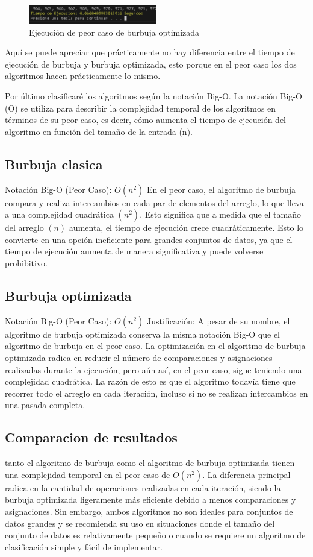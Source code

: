 \documentclass[journal]{IEEEtran}
\begin{document}
  \begin{figure}[H]
    \centering
    \begin{adjustbox}{clip=false}
      \includegraphics[width=0.5\textwidth]{23.PNG}
    \end{adjustbox}
    \caption{Ejecución de peor caso de burbuja optimizada}
  \end{figure}
  Aquí se puede apreciar que prácticamente no hay 
  diferencia entre el tiempo de ejecución de burbuja 
  y burbuja optimizada, esto porque en el peor caso 
  los dos algoritmos hacen prácticamente lo mismo.

  Por último clasificaré los algoritmos según la notación 
  Big-O. La notación
   Big-O (O) se utiliza para describir la complejidad 
   temporal de los algoritmos en términos de su peor 
   caso, es decir, cómo aumenta el tiempo de ejecución 
   del algoritmo en función del tamaño de la entrada (n).
   \subsection{Burbuja clasica}
   Notación Big-O (Peor Caso): $O(n^{2})$
 En el peor caso, el algoritmo de burbuja compara y 
 realiza intercambios en cada par de elementos del 
 arreglo, lo que lleva a una complejidad cuadrática 
 $(n^2)$. Esto significa que a medida que el tamaño del 
 arreglo $(n)$ aumenta, el tiempo de ejecución crece 
 cuadráticamente. Esto lo convierte en una opción 
 ineficiente para grandes conjuntos de datos, ya que el 
 tiempo de ejecución aumenta de manera significativa y 
 puede volverse prohibitivo.
 \subsection{Burbuja optimizada}
 Notación Big-O (Peor Caso): $O(n^{2})$
Justificación: A pesar de su nombre, el algoritmo 
de burbuja optimizada conserva la misma notación 
Big-O que el algoritmo de burbuja en el peor caso. 
La optimización en el algoritmo de burbuja optimizada 
radica en reducir el número de comparaciones y asignaciones 
realizadas durante la ejecución, pero aún así, en el peor 
caso, sigue teniendo una complejidad cuadrática. La razón 
de esto es que el algoritmo todavía tiene que recorrer 
todo el arreglo en cada iteración, incluso si no se realizan 
intercambios en una pasada completa.
\subsection{Comparacion de resultados}
tanto el algoritmo de burbuja como el algoritmo 
de burbuja optimizada tienen una complejidad 
temporal en el peor caso de $O(n^{2})$. La diferencia 
principal radica en la cantidad de operaciones 
realizadas en cada iteración, siendo la burbuja 
optimizada ligeramente más eficiente debido a menos 
comparaciones y asignaciones. Sin embargo, ambos 
algoritmos no son ideales para conjuntos de datos 
grandes y se recomienda su uso en situaciones donde 
el tamaño del conjunto de datos es relativamente 
pequeño o cuando se requiere un algoritmo de clasificación 
simple y fácil de implementar.
\end{document}
